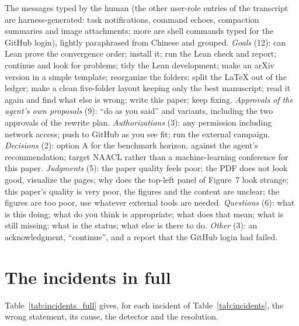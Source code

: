 The \nHuman{} messages typed by the human (the other \nHarness{} user-role entries of the
transcript are harness-generated: task notifications, command echoes, compaction summaries and
image attachments; \nShell{} more are shell commands typed for the GitHub login), lightly
paraphrased from Chinese and grouped. \emph{Goals} (12): can Lean prove the convergence order;
install it; run the Lean check and report; continue and look for problems; tidy the Lean
development; make an arXiv version in a simple template; reorganize the folders; split the LaTeX
out of the ledger; make a clean five-folder layout keeping only the best manuscript; read it again
and find what else is wrong; write this paper; keep fixing. \emph{Approvals of the agent's own
proposals} (9): ``do as you said'' and variants, including the two approvals of the rewrite plan.
\emph{Authorizations} (3): any permission including network access; push to GitHub as you see fit;
run the external campaign. \emph{Decisions} (2): option A for the benchmark horizon, against the
agent's recommendation; target NAACL rather than a machine-learning conference for this paper.
\emph{Judgments} (5): the paper quality
feels poor; the PDF does not look good, visualize the pages; why does the top-left panel of Figure~7
look strange; this paper's quality is very poor, the figures and the content are unclear; the
figures are too poor, use whatever external tools are needed. \emph{Questions} (6): what is this doing; what do you
think is appropriate; what does that mean; what is still missing; what is the status; what else is
there to do. \emph{Other} (3): an acknowledgment, ``continue'', and a report that the GitHub login
had failed.

\section{The incidents in full}
\label{app:incidents}

Table~\ref{tab:incidents_full} gives, for each incident of Table~\ref{tab:incidents}, the
wrong statement, its cause, the detector and the resolution.

